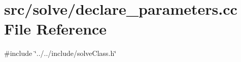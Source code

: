 \section{src/solve/declare\+\_\+parameters.cc File Reference}
\label{declare__parameters_8cc}
{\ttfamily \#include \char`\"{}../../include/solve\+Class.\+h\char`\"{}}\newline
